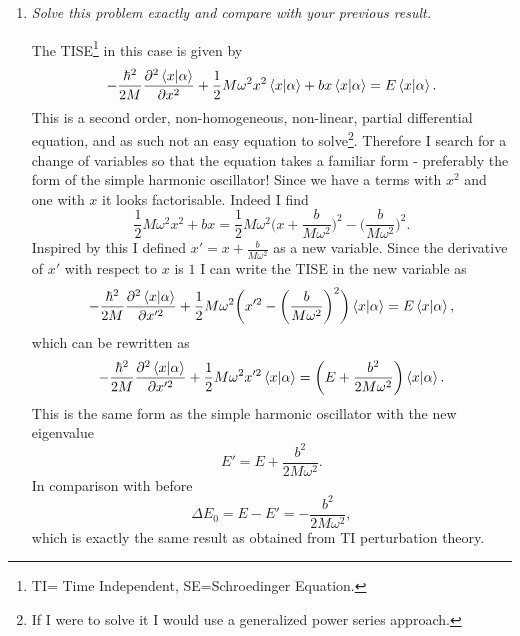 \begin{example}
\begin{enumerate}
		\item \emph{Solve this problem exactly and compare with your previous result.}\newline
		
		The TISE\footnote{TI= Time Independent, SE=Schroedinger Equation.} in this case is given by
		\begin{equation}
			-\frac{\hbar^2}{2M}\frac{\partial^2 \braket{x|\alpha}}{\partial x^2}+\frac{1}{2}M\omega^2x^2\braket{x|\alpha}+bx\braket{x|\alpha}=E\braket{x|\alpha}.
		\end{equation} 
		This is a second order, non-homogeneous, non-linear, partial differential equation, and as such not an easy equation to solve\footnote{If I were to solve it I would use a generalized power series approach.}. Therefore I search for a change of variables so that the equation takes a familiar form - preferably the form of the simple harmonic oscillator! Since we have a terms with $x^2$ and one with $x$ it looks factorisable. Indeed I find 
		\begin{equation}
			\frac{1}{2}M\omega^2x^2+bx=\frac{1}{2}M\omega^2\bigg(x+\frac{b}{M\omega^2}\bigg)^2-\bigg(\frac{b}{M\omega^2}\bigg)^2.
		\end{equation} 
		Inspired by this I defined $x'=x+\frac{b}{M\omega^2}$ as a new variable. Since the derivative of $x'$ with respect to $x$ is $1$ I can write the TISE in the new variable as
		\begin{equation}
			-\frac{\hbar^2}{2M}\frac{\partial^2 \braket{x|\alpha}}{\partial x'^2}+\frac{1}{2}M\omega^2\bigg(x'^2-\bigg(\frac{b}{M\omega^2}\bigg)^2\bigg)\braket{x|\alpha}=E\braket{x|\alpha},
		\end{equation} 
		which can be rewritten as
		\begin{equation}
			-\frac{\hbar^2}{2M}\frac{\partial^2 \braket{x|\alpha}}{\partial x'^2}+\frac{1}{2}M\omega^2x'^2\braket{x|\alpha}=\bigg(E+\frac{b^2}{2M\omega^2}\bigg)\braket{x|\alpha}.
		\end{equation} 
		This is the same form as the simple harmonic oscillator with the new eigenvalue
		\begin{equation}
			E'=E+\frac{b^2}{2M\omega^2}.
		\end{equation} 
		In comparison with before
		\begin{equation}
			\Delta E_0=E-E'=-\frac{b^2}{2M\omega^2},
		\end{equation} 
		which is exactly the same result as obtained from TI perturbation theory.	
	\end{enumerate}
\end{example}


